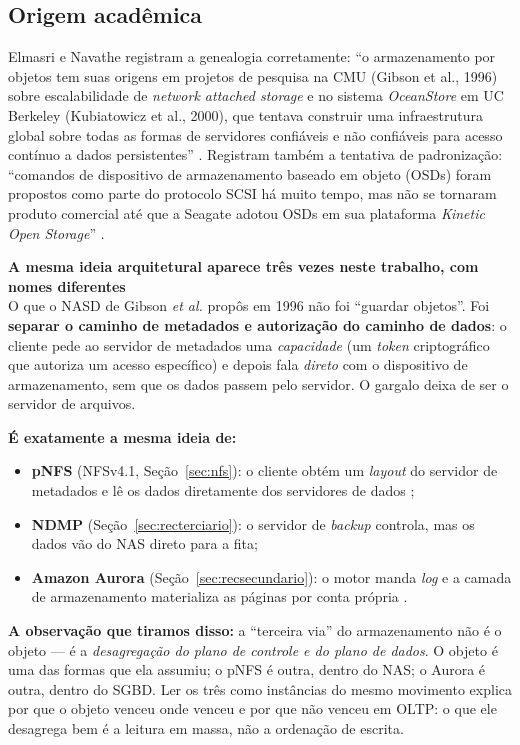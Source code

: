 \documentclass[11pt,a4paper]{article}
\newcommand{\destaque}[2]{%
  \begin{center}\begin{minipage}{0.96\textwidth}
  \colorbox{fundo}{\begin{minipage}{\dimexpr\linewidth-2\fboxsep}
  \vspace{2pt}\textbf{\color{azul}\small #1}\\[1pt]\footnotesize #2\vspace{3pt}
  \end{minipage}}\end{minipage}\end{center}}
\begin{document}
\subsection{Origem acadêmica}

Elmasri e Navathe registram a genealogia corretamente: ``o armazenamento por objetos tem suas
origens em projetos de pesquisa na CMU (Gibson et al., 1996) sobre escalabilidade de
\textit{network attached storage} e no sistema \textit{OceanStore} em UC Berkeley (Kubiatowicz et
al., 2000), que tentava construir uma infraestrutura global sobre todas as formas de servidores
confiáveis e não confiáveis para acesso contínuo a dados persistentes'' \cite{elmasri2018}.
Registram também a tentativa de padronização: ``comandos de dispositivo de armazenamento baseado em
objeto (OSDs) foram propostos como parte do protocolo SCSI há muito tempo, mas não se tornaram
produto comercial até que a Seagate adotou OSDs em sua plataforma \textit{Kinetic Open Storage}''
\cite{elmasri2018}.

\destaque{A mesma ideia arquitetural aparece três vezes neste trabalho, com nomes diferentes}{%
O que o NASD de Gibson \textit{et al.} propôs em 1996 não foi ``guardar objetos''. Foi
\textbf{separar o caminho de metadados e autorização do caminho de dados}: o cliente pede ao
servidor de metadados uma \emph{capacidade} (um \textit{token} criptográfico que autoriza um acesso
específico) e depois fala \emph{direto} com o dispositivo de armazenamento, sem que os dados passem
pelo servidor. O gargalo deixa de ser o servidor de arquivos.

\smallskip
\textbf{É exatamente a mesma ideia de:}
\begin{itemize}[leftmargin=0.7cm,itemsep=1pt,topsep=2pt]
\item \textbf{pNFS} (NFSv4.1, Seção~\ref{sec:nfs}): o cliente obtém um \textit{layout} do servidor de
      metadados e lê os dados diretamente dos servidores de dados \cite{rfc8881};
\item \textbf{NDMP} (Seção~\ref{sec:recterciario}): o servidor de \textit{backup} controla, mas os
      dados vão do NAS direto para a fita;
\item \textbf{Amazon Aurora} (Seção~\ref{sec:recsecundario}): o motor manda \textit{log} e a camada
      de armazenamento materializa as páginas por conta própria \cite{aurora2017}.
\end{itemize}

\textbf{A observação que tiramos disso:} a ``terceira via'' do armazenamento não é o objeto ---
é a \emph{desagregação do plano de controle e do plano de dados}. O objeto é uma das formas que ela
assumiu; o pNFS é outra, dentro do NAS; o Aurora é outra, dentro do SGBD. Ler os três como
instâncias do mesmo movimento explica por que o objeto venceu onde venceu e por que não venceu em
OLTP: o que ele desagrega bem é a leitura em massa, não a ordenação de escrita.}
\end{document}

